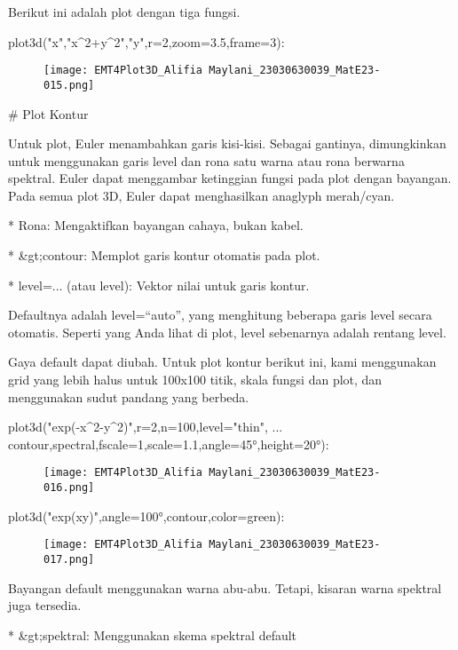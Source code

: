 \documentclass{article}
\begin{document}
Berikut ini adalah plot dengan tiga fungsi.


\>plot3d("x","x^2+y^2","y",r=2,zoom=3.5,frame=3):


\begin{figure}
    \centering
    \texttt{[image: EMT4Plot3D\_Alifia Maylani\_23030630039\_MatE23-015.png]}
    \caption{}
    \label{fig:enter-label}
\end{figure}
# Plot Kontur

Untuk plot, Euler menambahkan garis kisi-kisi. Sebagai gantinya,
dimungkinkan untuk menggunakan garis level dan rona satu warna atau
rona berwarna spektral. Euler dapat menggambar ketinggian fungsi pada
plot dengan bayangan. Pada semua plot 3D, Euler dapat menghasilkan
anaglyph merah/cyan.


* 
Rona: Mengaktifkan bayangan cahaya, bukan kabel.

* 
&gt;contour: Memplot garis kontur otomatis pada plot.

* 
level=... (atau level): Vektor nilai untuk garis kontur.


Defaultnya adalah level=“auto”, yang menghitung beberapa garis level
secara otomatis. Seperti yang Anda lihat di plot, level sebenarnya
adalah rentang level.


Gaya default dapat diubah. Untuk plot kontur berikut ini, kami
menggunakan grid yang lebih halus untuk 100x100 titik, skala fungsi
dan plot, dan menggunakan sudut pandang yang berbeda.


\>plot3d("exp(-x^2-y^2)",r=2,n=100,level="thin", ...  
\>    \>contour,\>spectral,fscale=1,scale=1.1,angle=45°,height=20°):


\begin{figure}
    \centering
    \texttt{[image: EMT4Plot3D\_Alifia Maylani\_23030630039\_MatE23-016.png]}
    \caption{}
    \label{fig:enter-label}
\end{figure}

\>plot3d("exp(x\*y)",angle=100°,\>contour,color=green):


\begin{figure}
    \centering
    \texttt{[image: EMT4Plot3D\_Alifia Maylani\_23030630039\_MatE23-017.png]}
    \caption{}
    \label{fig:enter-label}
\end{figure}

Bayangan default menggunakan warna abu-abu. Tetapi, kisaran warna
spektral juga tersedia.


* 
&gt;spektral: Menggunakan skema spektral default
\end{document}
